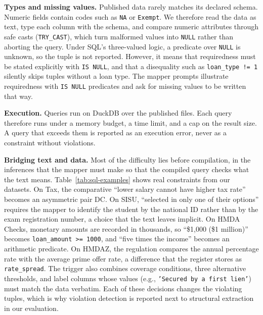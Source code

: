 \smallskip\noindent\textbf{Types and missing values.}
Published data rarely matches its declared schema. Numeric fields contain codes such as \texttt{NA} or \texttt{Exempt}. We therefore read the data as text, type each column with the schema, and compare numeric attributes through safe casts (\texttt{TRY\_CAST}), which turn malformed values into \texttt{NULL} rather than aborting the query. Under SQL's three-valued logic, a predicate over \texttt{NULL} is unknown, so the tuple is not reported. However, it means that requiredness must be stated explicitly with \texttt{IS NULL}, and that a disequality such as \texttt{loan\_type != 1} silently skips tuples without a loan type. The mapper prompts illustrate requiredness with \texttt{IS NULL} predicates and ask for missing values to be written that way.

\smallskip\noindent\textbf{Execution.}
Queries run on DuckDB over the published files. Each query therefore runs under a memory budget, a time limit, and a cap on the result size. A query that exceeds them is reported as an execution error, never as a constraint without violations.

\smallskip\noindent\textbf{Bridging text and data.}
Most of the difficulty lies before compilation, in the inferences that the mapper must make so that the compiled query checks what the text means. Table~\ref{tab:sql-examples} shows real constraints from our datasets. On Tax, the comparative ``lower salary cannot have higher tax rate'' becomes an asymmetric pair DC. On SISU, ``selected in only one of their options'' requires the mapper to identify the student by the national ID rather than by the exam registration number, a choice that the text leaves implicit. On HMDA Checks, monetary amounts are recorded in thousands, so ``\$1,000 (\$1 million)'' becomes \texttt{loan\_amount >= 1000}, and ``five times the income'' becomes an arithmetic predicate. On HMDAZ, the regulation compares the annual percentage rate with the average prime offer rate, a difference that the register stores as \texttt{rate\_spread}. The trigger also combines coverage conditions, three alternative thresholds, and label columns whose values (e.g., \texttt{'Secured by a first lien'}) must match the data verbatim. Each of these decisions changes the violating tuples, which is why violation detection is reported next to structural extraction in our evaluation.


